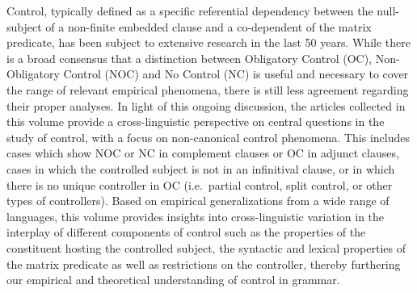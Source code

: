 Control, typically defined as a specific referential dependency between the null-subject of a non-finite embedded clause and a co-dependent of the matrix predicate, has been subject to extensive research in the last 50 years. While there is a broad consensus that a distinction between Obligatory Control (OC), Non-Obligatory Control (NOC) and No Control (NC) is useful and necessary to cover the range of relevant empirical phenomena, there is still less agreement regarding their proper analyses. In light of this ongoing discussion, the articles collected in this volume provide a cross-linguistic perspective on central questions in the study of control, with a focus on non-canonical control phenomena. This includes cases which show NOC or NC in complement clauses or OC in adjunct clauses, cases in which the controlled subject is not in an infinitival clause, or in which there is no unique controller in OC (i.e.\ partial control, split control, or other types of controllers). Based on empirical generalizations from a wide range of languages, this volume provides insights into cross-linguistic variation in the interplay of different components of control such as the properties of the constituent hosting the controlled subject, the syntactic and lexical properties of the matrix predicate as well as restrictions on the controller, thereby furthering our empirical and theoretical understanding of control in grammar.
\endinput